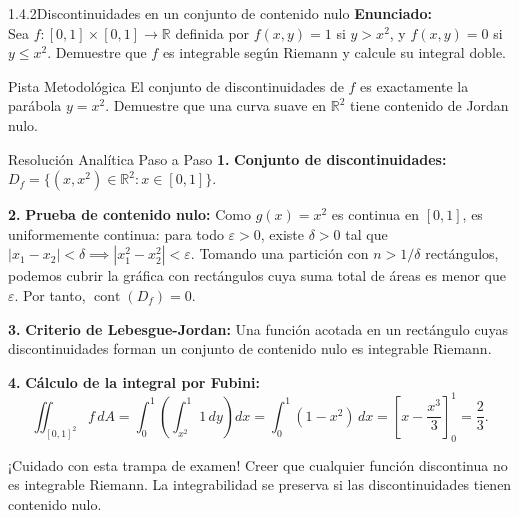 \documentclass[11pt,a4paper]{article}
\begin{document}
\begin{nivelbox}{1.4.2}{Discontinuidades en un conjunto de contenido nulo}
\textbf{Enunciado:}\\
Sea $f: [0,1] \times [0,1] \to \mathbb{R}$ definida por $f(x,y) = 1$ si $y > x^2$, y $f(x,y) = 0$ si $y \le x^2$. Demuestre que $f$ es integrable según Riemann y calcule su integral doble.

\begin{observacionbox}{Pista Metodológica}
El conjunto de discontinuidades de $f$ es exactamente la parábola $y = x^2$. Demuestre que una curva suave en $\mathbb{R}^2$ tiene contenido de Jordan nulo.
\end{observacionbox}

\begin{ejerciciobox}{Resolución Analítica Paso a Paso}
\smallskip\noindent\textbf{1.} \textbf{Conjunto de discontinuidades:}
$D_f = \{ (x, x^2) \in \mathbb{R}^2 : x \in [0, 1] \}$.

\smallskip\noindent\textbf{2.} \textbf{Prueba de contenido nulo:}
Como $g(x) = x^2$ es continua en $[0,1]$, es uniformemente continua: para todo $\varepsilon > 0$, existe $\delta > 0$ tal que $|x_1 - x_2| < \delta \implies |x_1^2 - x_2^2| < \varepsilon$.
Tomando una partición con $n > 1/\delta$ rectángulos, podemos cubrir la gráfica con rectángulos cuya suma total de áreas es menor que $\varepsilon$. Por tanto, $\operatorname{cont}(D_f) = 0$.

\smallskip\noindent\textbf{3.} \textbf{Criterio de Lebesgue-Jordan:}
Una función acotada en un rectángulo cuyas discontinuidades forman un conjunto de contenido nulo es integrable Riemann.

\smallskip\noindent\textbf{4.} \textbf{Cálculo de la integral por Fubini:}
\[\iint_{[0,1]^2} f \, dA = \int_0^1 \left( \int_{x^2}^1 1 \, dy \right) dx = \int_0^1 (1 - x^2) \, dx = \left[ x - \frac{x^3}{3} \right]_0^1 = \frac{2}{3}.\]
\end{ejerciciobox}

\begin{errorbox}{¡Cuidado con esta trampa de examen!}
Creer que cualquier función discontinua no es integrable Riemann. La integrabilidad se preserva si las discontinuidades tienen contenido nulo.
\end{errorbox}
\end{nivelbox}
\bigskip
\end{document}
